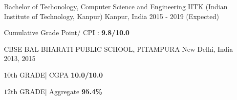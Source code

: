 \documentclass[12pt, a4paper]{awesome-cv}
\begin{document}
\makecvheader
\begin{cventries}
  \cventry
    {Bachelor of Techonology, Computer Science and Engineering}
    {IITK (Indian Institute of Technology, Kanpur)}
    {Kanpur, India}
    {2015 - 2019 (Expected)}
    {
      \begin{cvitems}
        \item {Cumulative Grade Point/ CPI :\textbf{ 9.8/10.0} }
      \end{cvitems}
    }
  \cventry
    {CBSE}
    {BAL BHARATI PUBLIC SCHOOL, PITAMPURA}
    {New Delhi, India}
    {2013, 2015}
    {
      \begin{cvitems}
        \item {$10$th GRADE| CGPA \textbf{10.0/10.0}}      
        \item {$12$th GRADE| Aggregate \textbf{95.4\%}}  
      \end{cvitems} 
    }
\end{cventries}
\end{document}
